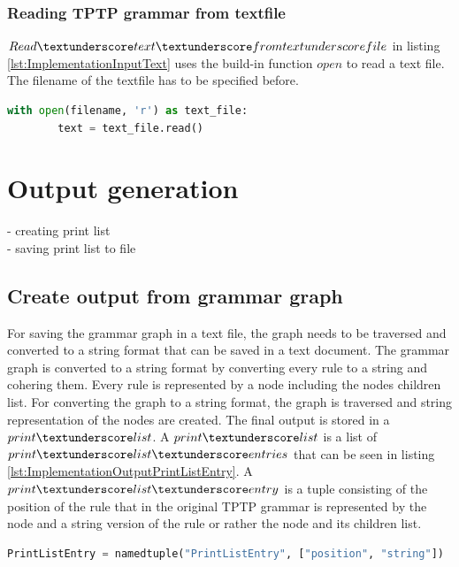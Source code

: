 \subsubsection{Reading \ac{TPTP} grammar from textfile}

$Read\textunderscore text\textunderscore fromtextunderscore file$ in listing \ref{lst:ImplementationInputText} uses the build-in function $open$ to read a text file. The filename of the textfile has to be specified before.\\

\begin{lstlisting}[language=Python, basicstyle=\scriptsize	,caption= Read text from file,label= lst:ImplementationInputText]
with open(filename, 'r') as text_file:
        text = text_file.read()
\end{lstlisting}

\section{Output generation}\label{sec:ImplementationOutputGeneration}

- creating print list\\ 
- saving print list to file

\subsection{Create output from grammar graph}\label{sec:ImplementationOutputGrammarGraph}

For saving the grammar graph in a text file, the graph needs to be traversed and converted to a string format that can be saved in a text document. The grammar graph is converted to a string format by converting every rule to a string and cohering them. Every rule is represented by a node including the nodes children list. For converting the graph to a string format, the graph is traversed and string representation of the nodes are created.
The final output is stored in a $print\textunderscore list$. A $print\textunderscore list$ is a list of $print\textunderscore list\textunderscore entries$ that can be seen in listing \ref{lst:ImplementationOutputPrintListEntry}. A $print\textunderscore list\textunderscore entry$ is a tuple consisting of the position of the rule that in the original \ac{TPTP} grammar is represented by the node and a string version of the rule or rather the node and its children list.

\begin{lstlisting}[language=Python, basicstyle=\scriptsize	,caption= Print List Entry,label= lst:ImplementationOutputPrintListEntry]
PrintListEntry = namedtuple("PrintListEntry", ["position", "string"])
\end{lstlisting}

